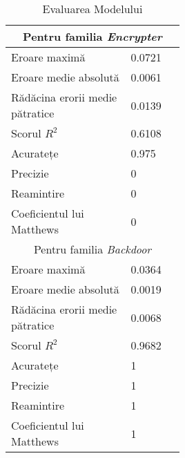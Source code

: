 \begin{table}[!htb]
    \centering
    \begin{tabular}{ | p{0.4\linewidth} | p{0.1\linewidth} | }
        \hline
        \multicolumn{2}{|c|}{Pentru familia \textit{Encrypter}} \\
        \hline
        Eroare maximă & 0.0721 \\
        Eroare medie absolută & 0.0061 \\
        Rădăcina erorii medie pătratice & 0.0139 \\
        Scorul $ R^2 $ & 0.6108 \\
        Acuratețe & 0.975 \\
        Precizie & 0 \\
        Reamintire & 0 \\
        Coeficientul lui Matthews & 0 \\
        \hline
        \multicolumn{2}{|c|}{Pentru familia \textit{Backdoor}} \\
        \hline
        Eroare maximă & 0.0364 \\
        Eroare medie absolută & 0.0019 \\
        Rădăcina erorii medie pătratice & 0.0068 \\
        Scorul $ R^2 $ & 0.9682 \\
        Acuratețe & 1 \\
        Precizie & 1 \\
        Reamintire & 1 \\
        Coeficientul lui Matthews & 1 \\
    \hline
    \end{tabular}
    \caption{Evaluarea Modelului }
    \label{tab:pe_static_full_classification_evaluation}
\end{table}